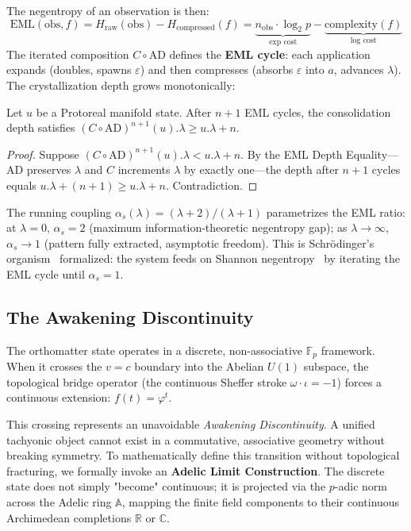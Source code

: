 The negentropy of an observation is then:
\begin{equation}
    \mathrm{EML}(\mathrm{obs}, f) = H_{\mathrm{raw}}(\mathrm{obs}) - H_{\mathrm{compressed}}(f) = \underbrace{n_{\mathrm{obs}} \cdot \log_2 p}_{\text{exp cost}} - \underbrace{\text{complexity}(f)}_{\text{log cost}}
\end{equation}
The iterated composition $C \circ \mathrm{AD}$ defines the \textbf{EML cycle}: each application expands (doubles, spawns $\varepsilon$) and then compresses (absorbs $\varepsilon$ into $a$, advances $\lambda$). The crystallization depth grows monotonically:

\begin{theorem}
\label{thm:monotone_negentropy}
Let $u$ be a Protoreal manifold state. After $n+1$ EML cycles, the consolidation depth satisfies $(C \circ \mathrm{AD})^{n+1}(u).\lambda \geq u.\lambda + n$. 
\end{theorem}
\begin{proof}
Suppose $(C \circ \mathrm{AD})^{n+1}(u).\lambda < u.\lambda + n$. By the EML Depth Equality---$\mathrm{AD}$ preserves $\lambda$ and $C$ increments $\lambda$ by exactly one---the depth after $n+1$ cycles equals $u.\lambda + (n+1) \geq u.\lambda + n$. Contradiction. \qedhere
\end{proof}

The running coupling $\alpha_s(\lambda) = (\lambda + 2)/(\lambda + 1)$ parametrizes the EML ratio: at $\lambda = 0$, $\alpha_s = 2$ (maximum information-theoretic negentropy gap); as $\lambda \to \infty$, $\alpha_s \to 1$ (pattern fully extracted, asymptotic freedom). This is Schr\"odinger's organism~\cite{Schrodinger1944} formalized: the system feeds on Shannon negentropy~\cite{Shannon1948} by iterating the EML cycle until $\alpha_s = 1$.

\subsection{The Awakening Discontinuity}

The orthomatter state operates in a discrete, non-associative $\mathbb{F}_p$ framework. When it crosses the $v=c$ boundary into the Abelian $U(1)$ subspace, the topological bridge operator (the continuous Sheffer stroke $\omega \cdot \iota = -1$) forces a continuous extension: $f(t) = \varphi^t$.

This crossing represents an unavoidable \textit{Awakening Discontinuity}. A unified tachyonic object cannot exist in a commutative, associative geometry without breaking symmetry. To mathematically define this transition without topological fracturing, we formally invoke an \textbf{Adelic Limit Construction}. The discrete state does not simply "become" continuous; it is projected via the $p$-adic norm across the Adelic ring $\mathbb{A}$, mapping the finite field components to their continuous Archimedean completions $\mathbb{R}$ or $\mathbb{C}$.

